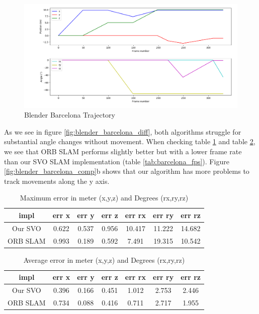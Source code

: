 \documentclass[11pt,a4paper,titlepage,oneside]{report}
\begin{document}
\begin{figure}[H]
  \includegraphics[width=1.0\textwidth]{img/blender_barcelona_traj.png}
  \caption{Blender Barcelona Trajectory}\label{fig:blender_barcelona_traj}
\end{figure}

As we see in figure \ref{fig:blender_barcelona_diff}, both algorithms struggle for substantial angle changes without movement. When checking table \ref{tab:barcelona_maximas} and table \ref{tab:barcelona_average}, we see that ORB SLAM performs slightly better but with a lower frame rate than our SVO SLAM implementation (table \ref{tab:barcelona_fps}). Figure \ref{fig:blender_barcelona_comp}b shows that our algorithm has more problems to track movements along the y axis.

\begin{table}[H]
  \centering
  \begin{tabular}{|c|c|c|c|c|c|c|}
  impl & err x & err y & err z & err rx & err ry & err rz\\
  \hline
  Our SVO & 0.622 & 0.537 & 0.956 & 10.417 & 11.222 & 14.682\\
  ORB SLAM& 0.993 & 0.189 & 0.592 & 7.491 & 19.315 & 10.542
\end{tabular}
\caption{Maximum error in meter (x,y,z) and Degrees (rx,ry,rz)}
\label{tab:barcelona_maximas}
\end{table}

\begin{table}[H]
  \centering
  \begin{tabular}{|c|c|c|c|c|c|c|}
    impl & err x & err y & err z & err rx & err ry & err rz\\
    \hline
    Our SVO & 0.396 & 0.166 & 0.451 & 1.012 & 2.753 & 2.446\\
    ORB SLAM & 0.734 & 0.088 & 0.416 & 0.711 & 2.717 & 1.955
  \end{tabular}
\caption{Average error in meter (x,y,z) and Degrees (rx,ry,rz)}
\label{tab:barcelona_average}
\end{table}
\end{document}
